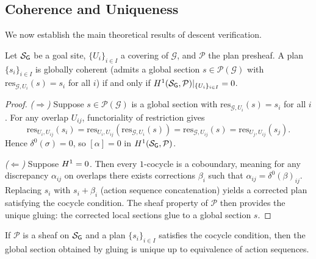 \documentclass[11pt]{article}
\newcommand{\PlanSheaf}{\mathcal{P}}
\newcommand{\GoalSite}{\Site_{\mathsf{G}}}
\newcommand{\SubGoal}[1]{U_{#1}}
\newcommand{\GoalSpace}{\mathcal{G}}
\newcommand{\CoverFam}{\{U_i\}_{i \in I}}
\newcommand{\PlanRes}{\mathrm{res}}
\begin{document}
\subsection{Coherence and Uniqueness}\label{ssec:coherence}

We now establish the main theoretical results of descent
verification.

\begin{theorem}\label{thm:coherence}
  Let $\GoalSite$ be a goal site, $\CoverFam$ a covering of
  $\GoalSpace$, and $\PlanSheaf$ the plan presheaf.  A plan
  $\{s_i\}_{i \in I}$ is globally coherent (\ie admits a global
  section $s \in \PlanSheaf(\GoalSpace)$ with
  $\PlanRes_{\GoalSpace, \SubGoal{i}}(s) = s_i$ for all $i$)
  if and only if $\Hcoh{1}(\GoalSite, \PlanSheaf)|_{\CoverFam} = 0$.
\end{theorem}

\begin{proof}
  \emph{($\Rightarrow$)}
  Suppose $s \in \PlanSheaf(\GoalSpace)$ is a global section with
  $\PlanRes_{\GoalSpace, \SubGoal{i}}(s) = s_i$ for all $i$.
  For any overlap $\SubGoal{ij}$, functoriality of restriction gives
  \[
    \PlanRes_{\SubGoal{i}, \SubGoal{ij}}(s_i)
    = \PlanRes_{\SubGoal{i}, \SubGoal{ij}}(\PlanRes_{\GoalSpace, \SubGoal{i}}(s))
    = \PlanRes_{\GoalSpace, \SubGoal{ij}}(s)
    = \PlanRes_{\SubGoal{j}, \SubGoal{ij}}(s_j).
  \]
  Hence $\delta^0(\sigma) = 0$, so $[\alpha] = 0$ in
  $\Hcoh{1}(\GoalSite, \PlanSheaf)$.

  \emph{($\Leftarrow$)}
  Suppose $H^{1} = 0$.  Then every $1$-cocycle is a coboundary,
  meaning for any discrepancy $\alpha_{ij}$ on overlaps there
  exists corrections $\beta_i$ such that
  $\alpha_{ij} = \delta^0(\beta)_{ij}$.  Replacing $s_i$ with
  $s_i + \beta_i$ (action sequence concatenation) yields a
  corrected plan satisfying the cocycle condition.  The sheaf
  property of $\PlanSheaf$ then provides the unique gluing:
  the corrected local sections glue to a global section $s$.
\end{proof}

\begin{theorem}\label{thm:uniqueness}
  If $\PlanSheaf$ is a sheaf on $\GoalSite$ and a plan
  $\{s_i\}_{i \in I}$ satisfies the cocycle condition, then
  the global section obtained by gluing is unique up to
  equivalence of action sequences.
\end{theorem}
\end{document}
